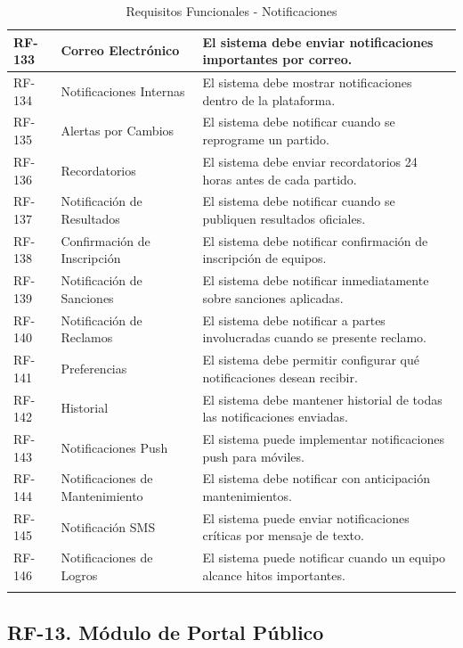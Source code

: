 \documentclass[12pt,a4paper]{article}
\begin{document}
\begin{longtable}{|>{\centering\arraybackslash}p{1.5cm}|>{\raggedright\arraybackslash}p{3.2cm}|>{\raggedright\arraybackslash}p{9cm}|}
RF-133 & Correo Electrónico & El sistema debe enviar notificaciones importantes por correo. \\
\hline
\rowcolor{rowgray}
RF-134 & Notificaciones Internas & El sistema debe mostrar notificaciones dentro de la plataforma. \\
\hline
RF-135 & Alertas por Cambios & El sistema debe notificar cuando se reprograme un partido. \\
\hline
\rowcolor{rowgray}
RF-136 & Recordatorios & El sistema debe enviar recordatorios 24 horas antes de cada partido. \\
\hline
RF-137 & Notificación de Resultados & El sistema debe notificar cuando se publiquen resultados oficiales. \\
\hline
\rowcolor{rowgray}
RF-138 & Confirmación de Inscripción & El sistema debe notificar confirmación de inscripción de equipos. \\
\hline
RF-139 & Notificación de Sanciones & El sistema debe notificar inmediatamente sobre sanciones aplicadas. \\
\hline
\rowcolor{rowgray}
RF-140 & Notificación de Reclamos & El sistema debe notificar a partes involucradas cuando se presente reclamo. \\
\hline
RF-141 & Preferencias & El sistema debe permitir configurar qué notificaciones desean recibir. \\
\hline
\rowcolor{rowgray}
RF-142 & Historial & El sistema debe mantener historial de todas las notificaciones enviadas. \\
\hline
RF-143 & Notificaciones Push & El sistema puede implementar notificaciones push para móviles. \\
\hline
\rowcolor{rowgray}
RF-144 & Notificaciones de Mantenimiento & El sistema debe notificar con anticipación mantenimientos. \\
\hline
RF-145 & Notificación SMS & El sistema puede enviar notificaciones críticas por mensaje de texto. \\
\hline
\rowcolor{rowgray}
RF-146 & Notificaciones de Logros & El sistema puede notificar cuando un equipo alcance hitos importantes. \\
\hline
\caption{Requisitos Funcionales - Notificaciones}
\end{longtable}

\subsection{RF-13. Módulo de Portal Público}
\end{document}
